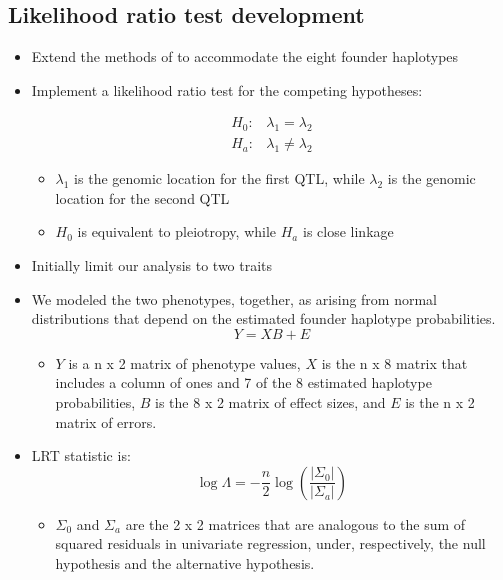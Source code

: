 \documentclass[a0,landscape]{a0poster}
\begin{document}
\begin{multicols}{4}
\subsection*{Likelihood ratio test development}

\begin{itemize}
\item Extend the methods of \cite{jiang1995multiple} to accommodate the eight founder haplotypes
\item Implement a likelihood ratio test for the competing hypotheses:

\begin{eqnarray}
H_0: & \lambda_1 = \lambda_2\nonumber \\
H_a: & \lambda_1 \neq \lambda_2\nonumber
\end{eqnarray}
\begin{itemize}
\item $\lambda_1$ is the genomic location for the first QTL, while $\lambda_2$ is the genomic location for the second QTL
\item $H_0$ is equivalent to pleiotropy, while $H_a$ is close linkage
\end{itemize}
\item Initially limit our analysis to two traits
\item We modeled the two phenotypes, together, as arising from normal distributions that depend on the estimated founder haplotype probabilities.
\begin{equation}
Y = XB + E
\end{equation}
\begin{itemize}
\item $Y$ is a n x 2 matrix of phenotype values, $X$ is the n x 8 matrix that includes a column of ones and 7 of the 8 estimated haplotype probabilities, $B$ is the 8 x 2 matrix of effect sizes, and $E$ is the n x 2 matrix of errors.
\end{itemize}
\item LRT statistic is:
\begin{equation}
\log \Lambda = - \frac{n}{2}\log \left( \frac{|\Sigma_0|}{|\Sigma_a|}\right)
\end{equation}
\begin{itemize}
\item $\Sigma_0$ and $\Sigma_a$ are the 2 x 2 matrices that are analogous to the sum of squared residuals in univariate regression, under, respectively, the null hypothesis and the alternative hypothesis.
\end{itemize}
\end{itemize}


\end{multicols}
\end{document}

